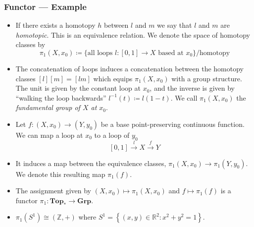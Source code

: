 \documentclass[UTF8,11pt,colorlinks,compress,openany]{beamer}%
\begin{document}
\begin{frame}\frametitle{Functor --- Example}
\setlength\abovedisplayskip{0pt}
\setlength\belowdisplayskip{0pt}
\begin{itemize}
\item If there exists a homotopy $h$ between $l$ and $m$ we say that $l$ and $m$ are \emph{homotopic}. This is an equivalence relation. We denote the space of homotopy classes by 
\[\pi_1(X,x_0)\coloneqq \{\mbox{all loops } l:[0,1]\to X \mbox{ based at }x_0\}/\mbox{homotopy}\]
\item The concatenation of loops induces a concatenation between the homotopy classes $[l][m]=[lm]$ which equips $\pi_1(X,x_0)$ with a group structure. The unit is given by the constant loop at $x_0$, and the inverse is given by ``walking the loop backwards'' $l^{-1}(t)\coloneqq l(1-t)$. We call $\pi_1(X,x_0)$ the \emph{fundamental group of $X$ at $x_0$}. 
\item Let $f:(X,x_0)\to (Y,y_0)$ be a base point-preserving continuous function. We can map a loop at $x_0$ to a loop of $y_0$
\[
 \left[0,1\right] \xrightarrow{l} X \xrightarrow{f} Y
\]
\item It induces a map between the equivalence classes, $\pi_1(X,x_0) \to \pi_1(Y,y_0)$. We denote this resulting map $\pi_1(f)$.
\item The assignment given by $(X,x_0)\mapsto \pi_1(X,x_0)$ and $f\mapsto \pi_1(f)$ is a functor $\pi_1:\mathbf{Top_*}\to\mathbf{Grp}$.
\item $\pi_1(S^1)\cong(\mathbb{Z},+)$ where $S^1=\left\{(x,y)\in\mathbb{R}^2: x^2+y^2=1\right\}$.
\end{itemize}
\end{frame}
\end{document}
